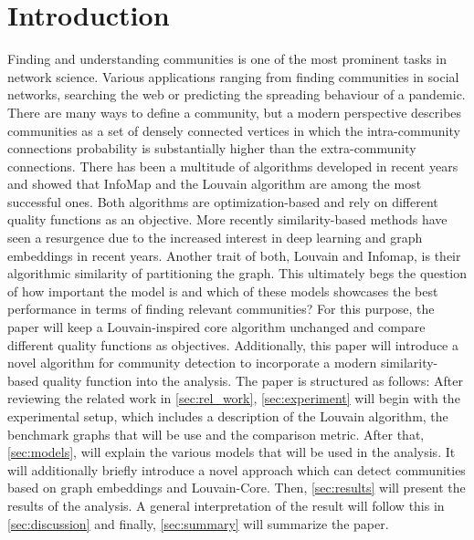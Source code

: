 \documentclass[11pt, twocolumn]{article}
\begin{document}
\section{Introduction}
Finding and understanding communities is one of the most prominent tasks in network science. Various applications ranging from finding communities in social networks, searching the web or predicting the spreading behaviour of a pandemic. There are many ways to define a community, but a modern perspective describes communities as a set of densely connected vertices in which the intra-community connections probability is substantially higher than the extra-community connections.\cite{fortunato_CommunityDetectionNetworks_2016} There has been a multitude of algorithms developed in recent years and \citeauthor{lancichinetti_CommunityDetectionAlgorithms_2009} showed that InfoMap and the Louvain algorithm are among the most successful ones.\cite{lancichinetti_CommunityDetectionAlgorithms_2009} Both algorithms are optimization-based and rely on different quality functions as an objective. More recently similarity-based methods have seen a resurgence due to the increased interest in deep learning and graph embeddings in recent years.\cite{liu_DeepLearningCommunity_2020} Another trait of both, Louvain and Infomap, is their algorithmic similarity of partitioning the graph.\cite{rosvall_MapEquation_2009} This ultimately begs the question of how important the model is and which of these models showcases the best performance in terms of finding relevant communities? For this purpose, the paper will keep a Louvain-inspired core algorithm unchanged and compare different quality functions as objectives.\cite{blondel_FastUnfoldingCommunities_2008} Additionally, this paper will introduce a novel algorithm for community detection to incorporate a modern similarity-based quality function into the analysis. 
The paper is structured as follows: After reviewing the related work in \autoref{sec:rel_work}, \autoref{sec:experiment} will begin with the experimental setup, which includes a description of the Louvain algorithm, the benchmark graphs that will be use and the comparison metric. After that, \autoref{sec:models}, will explain the various models that will be used in the analysis. It will additionally briefly introduce a novel approach which can detect communities based on graph embeddings and Louvain-Core. Then, \autoref{sec:results} will present the results of the analysis. A general interpretation of the result will follow this in \autoref{sec:discussion} and finally, \autoref{sec:summary} will summarize the paper.
\end{document}
